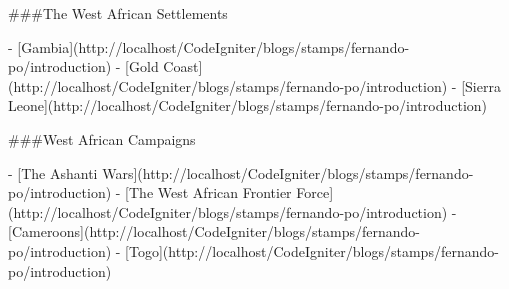 \#\#\#The West African Settlements

- [Gambia](http://localhost/CodeIgniter/blogs/stamps/fernando-po/introduction)
- [Gold Coast](http://localhost/CodeIgniter/blogs/stamps/fernando-po/introduction)
- [Sierra Leone](http://localhost/CodeIgniter/blogs/stamps/fernando-po/introduction)

\#\#\#West African Campaigns

- [The Ashanti Wars](http://localhost/CodeIgniter/blogs/stamps/fernando-po/introduction)
- [The West African Frontier Force](http://localhost/CodeIgniter/blogs/stamps/fernando-po/introduction)
- [Cameroons](http://localhost/CodeIgniter/blogs/stamps/fernando-po/introduction)
- [Togo](http://localhost/CodeIgniter/blogs/stamps/fernando-po/introduction)

  